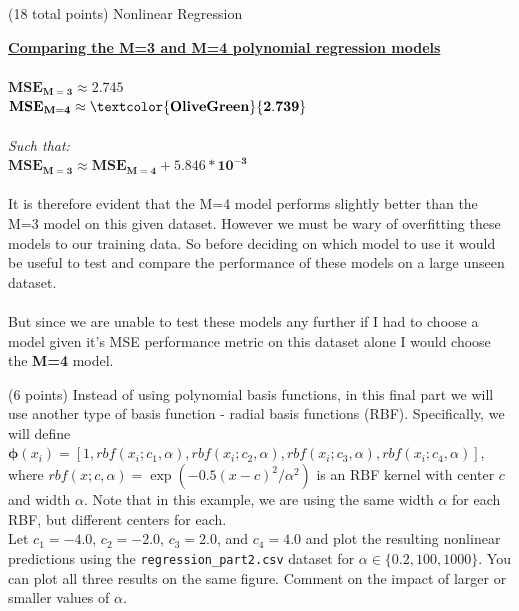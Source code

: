 \documentclass[12pt]{article}
\begin{document}
\begin{question}{(18 total points) Nonlinear Regression}
\begin{subquestion}
\begin{answerbox}{23em}
\large{\textbf{\underline{Comparing the M=3 and M=4 polynomial regression models}}}\\
\\
\normalsize{
$\mathbf{MSE_{M=3} \approx 2.745}$\\
$\mathbf{MSE_{M=4} \approx \textcolor{OliveGreen}{2.739}}$\\
\\
\emph{Such that:}\\
$\mathbf{MSE_{M=3} \approx MSE_{M=4} + 5.846 * 10^{-3}}$\\
\\
It is therefore evident that the M=4 model performs slightly better than the M=3 model on this given dataset. However we must be wary of overfitting these models to our training data. So before deciding on which model to use it would be useful to test and compare the performance of these models on a large unseen dataset.\\
\\
But since we are unable to test these models any further if I had to choose a model given it's MSE performance metric on this dataset alone I would choose the \textbf{M=4} model.
}
\end{answerbox}



\end{subquestion}



%
%
\begin{subquestion}{(6 points) Instead of using polynomial basis functions, in this final part we will use another type of basis function - radial basis functions (RBF). 
Specifically, we will define $\boldsymbol{\phi}(x_i) = [1, rbf(x_i; c_1, \alpha), rbf(x_i; c_2, \alpha), rbf(x_i; c_3, \alpha), rbf(x_i; c_4, \alpha)]$, where $rbf(x; c, \alpha) =  \exp(-0.5(x-c)^2 / \alpha^2)$ is an RBF kernel with center $c$ and width $\alpha$. Note that in this example, we are using the same width $\alpha$ for each RBF, but different centers for each.\\ 
Let $c_1=-4.0$, $c_2=-2.0$, $c_3=2.0$, and $c_4=4.0$ and plot the resulting nonlinear predictions using the \texttt{regression\_part2.csv} dataset for $\alpha \in \{0.2, 100, 1000\}$. 
You can plot all three results on the same figure.
Comment on the impact of larger or smaller values of $\alpha$.
}



\end{subquestion}
\end{question}
\end{document}
